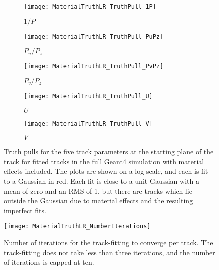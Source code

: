     \begin{figure}
    \centering
        \begin{subfigure}[t]{0.45\textwidth}
            \centering
            \texttt{[image: MaterialTruthLR\_TruthPull\_1P]}
            \caption{$1/P$}
        \end{subfigure}%

        \vspace{0mm}
        \begin{subfigure}[t]{0.45\textwidth}
            \centering
            \texttt{[image: MaterialTruthLR\_TruthPull\_PuPz]}
            \caption{$P_{u}/P_{z}$}
        \end{subfigure}
        \begin{subfigure}[t]{0.45\textwidth}
            \centering
            \texttt{[image: MaterialTruthLR\_TruthPull\_PvPz]}
            \caption{$P_{v}/P_{z}$}
        \end{subfigure}%
        \vspace{0mm}
        \begin{subfigure}[t]{0.45\textwidth}
            \centering
            \texttt{[image: MaterialTruthLR\_TruthPull\_U]}
            \caption{$U$}
        \end{subfigure}
        \begin{subfigure}[t]{0.45\textwidth}
            \centering
            \texttt{[image: MaterialTruthLR\_TruthPull\_V]}
            \caption{$V$}
        \end{subfigure}%
    \caption[Track parameter truth pulls for fitted tracks in the \gmtwo Geant4 simulation with material effects included]{Truth pulls for the five track parameters at the starting plane of the track for fitted tracks in the full \gmtwo Geant4 simulation with material effects included. The plots are shown on a log scale, and each is fit to a Gaussian in red. Each fit is close to a unit Gaussian with a mean of zero and an RMS of 1, but there are tracks which lie outside the Gaussian due to material effects and the resulting imperfect fits.}
    \label{fig:MaterialTruthPulls}
    \end{figure}

    \begin{figure}
      \centering
      \texttt{[image: MaterialTruthLR\_NumberIterations]}
        \caption[Number of iterations for the track-fitting to converge]{Number of iterations for the track-fitting to converge per track. The track-fitting does not take less than three iterations, and the number of iterations is capped at ten.}
        \label{fig:Iterations}
    \end{figure}


